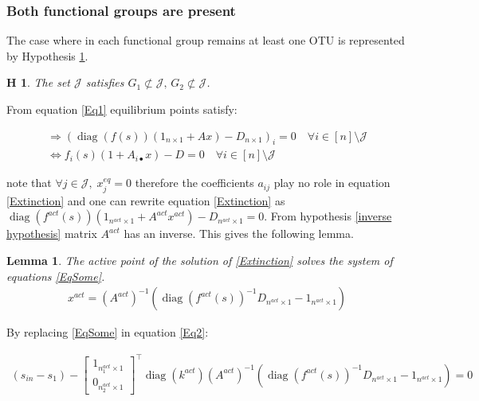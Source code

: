\documentclass[3p,times]{article}
\DeclareMathOperator{\diag}{diag}
\newtheorem{hypo}{H}
\newtheorem{lemma}{Lemma}
\begin{document}
\subsubsection{Both functional groups are present}

The case where in each functional group remains at least one OTU is represented by Hypothesis \ref{hypothesis CN}.
\begin{hypo}The set $\mathcal{J}$ satisfies $ G_1 \not \subset \mathcal{J} , \, G_2 \not \subset \mathcal{J} $.
	\label{hypothesis CN}
\end{hypo} 

From equation \eqref{Eq1} equilibrium points satisfy: 

\begin{align}
\Rightarrow  (\diag (f(s))(1_{n\times 1}+ Ax) - D_{n\times 1})_i = 0 \quad \forall i \in [n]\setminus \mathcal{J} \\
\Leftrightarrow f_i(s)(1 + A_{i\bullet}x) - D = 0 \quad \forall i \in [n]\setminus \mathcal{J} \label{Extinction}
\end{align} 

note that $\forall j \in \mathcal{J}, \; x^{eq}_j = 0 $ therefore the coefficients $a_{ij}$ play no role in equation \eqref{Extinction} and one can rewrite equation \eqref{Extinction} as $\diag(f^{act}(s))(1_{n^{act}\times 1} + A^{act}x^{act}) - D_{n^{act} \times 1}=0 $. From hypothesis \ref{inverse hypothesis} matrix $A^{act}$ has an inverse. This gives the following lemma.

\begin{lemma} 
	The active point of the solution of \eqref{Extinction} solves the system of equations \eqref{EqSome}. 
	\begin{align}
	\label{EqSome}x^{act} = (A^{act})^{-1}(\diag(f^{act}(s))^{-1}D_{n^{act}\times 1} - 1_{n^{act}\times 1})
	\end{align} 
\end{lemma} 

By replacing \eqref{EqSome} in equation \eqref{Eq2}:


\begin{align}
\label{s1Equilibria} (s_{in}-s_1)-	\begin{bmatrix}
1_{n_1^{act}\times 1} \\0_{n_2^{act}\times 1}
\end{bmatrix}^\top \diag (k^{act}) (A^{act})^{-1}(\diag(f^{act}(s))^{-1}D_{n^{act}\times 1}-1_{n^{act}\times 1}) = 0 
\end{align}
\end{document}
